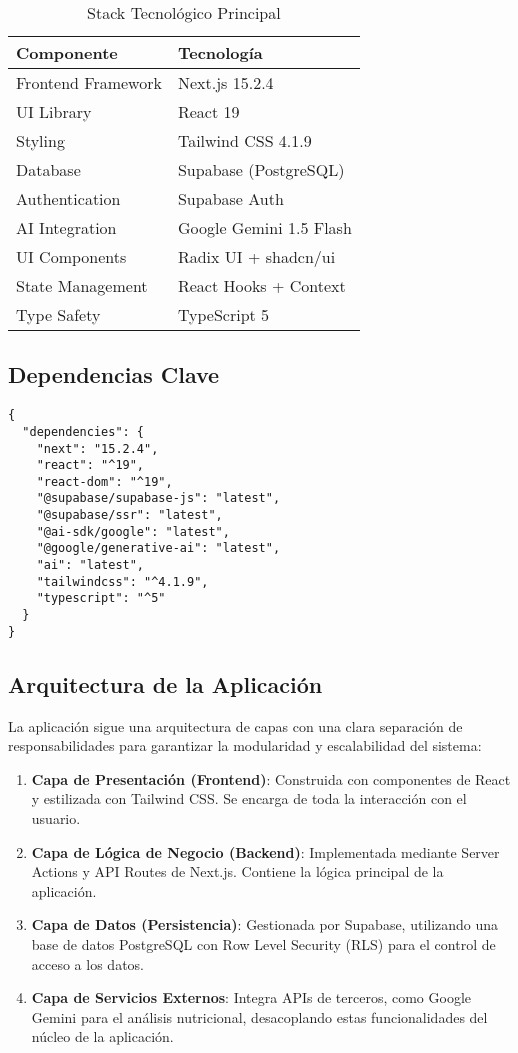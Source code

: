\documentclass[12pt,a4paper]{article}
\begin{document}
\begin{table}[H]
\centering
\begin{tabular}{@{}ll@{}}
\toprule
\textbf{Componente} & \textbf{Tecnología} \\
\midrule
Frontend Framework & Next.js 15.2.4 \\
UI Library & React 19 \\
Styling & Tailwind CSS 4.1.9 \\
Database & Supabase (PostgreSQL) \\
Authentication & Supabase Auth \\
AI Integration & Google Gemini 1.5 Flash \\
UI Components & Radix UI + shadcn/ui \\
State Management & React Hooks + Context \\
Type Safety & TypeScript 5 \\
\bottomrule
\end{tabular}
\caption{Stack Tecnológico Principal}
\label{tab:stack}
\end{table}

\subsection{Dependencias Clave}

\begin{lstlisting}[caption={package.json - Dependencias principales}, label={lst:package-json}]
{
  "dependencies": {
    "next": "15.2.4",
    "react": "^19",
    "react-dom": "^19",
    "@supabase/supabase-js": "latest",
    "@supabase/ssr": "latest",
    "@ai-sdk/google": "latest",
    "@google/generative-ai": "latest",
    "ai": "latest",
    "tailwindcss": "^4.1.9",
    "typescript": "^5"
  }
}
\end{lstlisting}

\subsection{Arquitectura de la Aplicación}

La aplicación sigue una arquitectura de capas con una clara separación de responsabilidades para garantizar la modularidad y escalabilidad del sistema:

\begin{enumerate}
    \item \textbf{Capa de Presentación (Frontend)}: Construida con componentes de React y estilizada con Tailwind CSS. Se encarga de toda la interacción con el usuario.
    \item \textbf{Capa de Lógica de Negocio (Backend)}: Implementada mediante Server Actions y API Routes de Next.js. Contiene la lógica principal de la aplicación.
    \item \textbf{Capa de Datos (Persistencia)}: Gestionada por Supabase, utilizando una base de datos PostgreSQL con Row Level Security (RLS) para el control de acceso a los datos.
    \item \textbf{Capa de Servicios Externos}: Integra APIs de terceros, como Google Gemini para el análisis nutricional, desacoplando estas funcionalidades del núcleo de la aplicación.
\end{enumerate}
\end{document}
